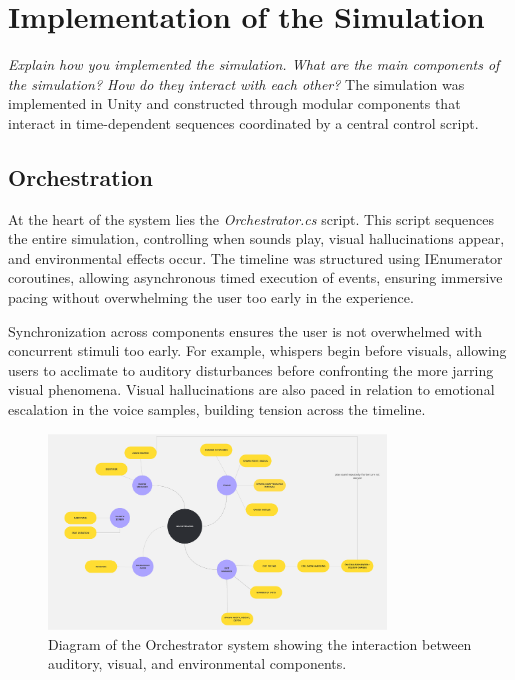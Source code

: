 \section{Implementation of the Simulation}
\emph{Explain how you implemented the simulation. What are the main components of the simulation? How do they interact with each other?}
The simulation was implemented in Unity and constructed through modular components that interact in time-dependent sequences coordinated by a central control script.

\subsection{Orchestration}
At the heart of the system lies the \textit{Orchestrator.cs} script. This script sequences the entire simulation, controlling when sounds play, visual hallucinations appear, and environmental effects occur. The timeline was structured using IEnumerator coroutines, allowing asynchronous timed execution of events, ensuring immersive pacing without overwhelming the user too early in the experience.

Synchronization across components ensures the user is not overwhelmed with concurrent stimuli too early. For example, whispers begin before visuals, allowing users to acclimate to auditory disturbances before confronting the more jarring visual phenomena. Visual hallucinations are also paced in relation to emotional escalation in the voice samples, building tension across the timeline.

\begin{figure}[h!]
    \centering
    \includegraphics[width=0.8\textwidth]{../../Figures/Orch-sequence.png}
    \caption{Diagram of the Orchestrator system showing the interaction between auditory, visual, and environmental components.}
    \label{fig:orchestrator}
\end{figure}


